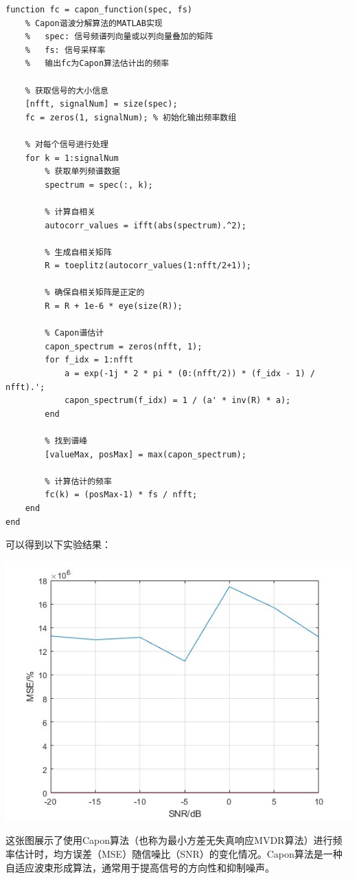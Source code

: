 \documentclass[a4paper,12pt]{article}
\begin{document}
\begin{lstlisting}
function fc = capon_function(spec, fs)
    % Capon谐波分解算法的MATLAB实现
    %   spec: 信号频谱列向量或以列向量叠加的矩阵
    %   fs: 信号采样率
    %   输出fc为Capon算法估计出的频率

    % 获取信号的大小信息
    [nfft, signalNum] = size(spec);
    fc = zeros(1, signalNum); % 初始化输出频率数组
    
    % 对每个信号进行处理
    for k = 1:signalNum
        % 获取单列频谱数据
        spectrum = spec(:, k);

        % 计算自相关
        autocorr_values = ifft(abs(spectrum).^2);

        % 生成自相关矩阵
        R = toeplitz(autocorr_values(1:nfft/2+1));

        % 确保自相关矩阵是正定的
        R = R + 1e-6 * eye(size(R));

        % Capon谱估计
        capon_spectrum = zeros(nfft, 1);
        for f_idx = 1:nfft
            a = exp(-1j * 2 * pi * (0:(nfft/2)) * (f_idx - 1) / nfft).';
            capon_spectrum(f_idx) = 1 / (a' * inv(R) * a);
        end
        
        % 找到谱峰
        [valueMax, posMax] = max(capon_spectrum);
        
        % 计算估计的频率
        fc(k) = (posMax-1) * fs / nfft;
    end
end

\end{lstlisting}

可以得到以下实验结果：

\centering 
\includegraphics[width=0.8\linewidth]{images/2_Application/capon.jpg}
\justifying

这张图展示了使用Capon算法（也称为最小方差无失真响应MVDR算法）进行频率估计时，均方误差（MSE）随信噪比（SNR）的变化情况。Capon算法是一种自适应波束形成算法，通常用于提高信号的方向性和抑制噪声。
\end{document}
